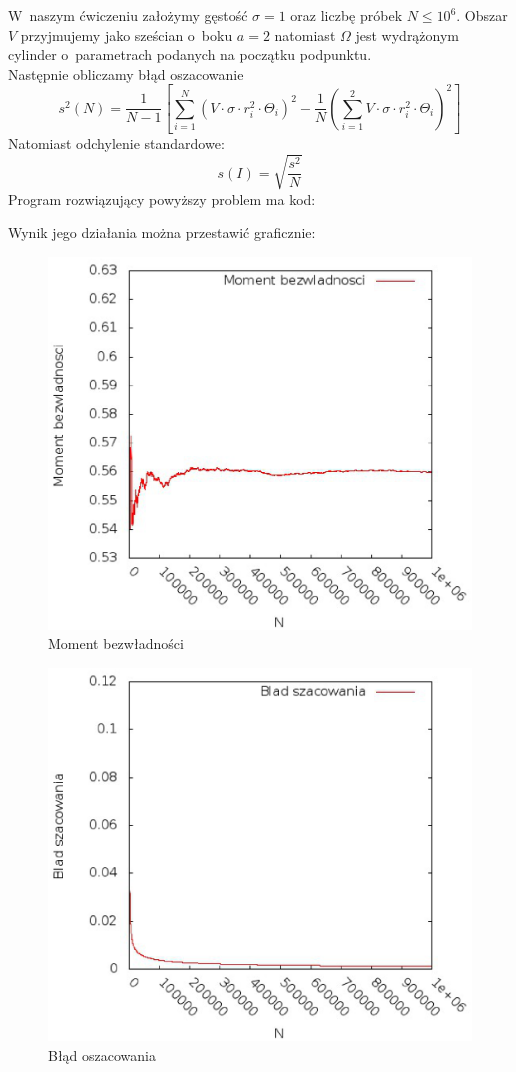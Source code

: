 \documentclass[10pt,a4paper]{article}
\begin{document}
\begin{enumerate}
W~naszym ćwiczeniu założymy gęstość $\sigma=1$ oraz liczbę próbek $N\leq10^6$. Obszar $V$ przyjmujemy jako sześcian o~boku $a=2$ natomiast $\Omega$ jest wydrążonym cylinder o~parametrach podanych na początku podpunktu.\\
Następnie obliczamy błąd oszacowanie
$$s^2(N)=\dfrac{1}{N-1}\left[\sum\limits_{i=1}^N(V\cdot\sigma\cdot r_i^2\cdot\Theta_i)^2-\dfrac{1}{N}\left(\sum\limits_{i=1}^2V\cdot\sigma\cdot r_i^2\cdot\Theta_i\right)^2\right]$$
Natomiast odchylenie standardowe:
$$s(I)=\sqrt{\dfrac{s^2}{N}}$$
Program rozwiązujący powyższy problem ma kod:

Wynik jego działania można przestawić graficznie:
\begin{center}
\begin{figure}
\caption{Moment bezwładności}
\includegraphics[scale=0.5]{plot.eps}
\end{figure}
\end{center}
\begin{figure}
\caption{Błąd oszacowania}
\includegraphics[scale=0.5]{plot2.eps}

\end{figure}
\end{enumerate}
\end{document}
